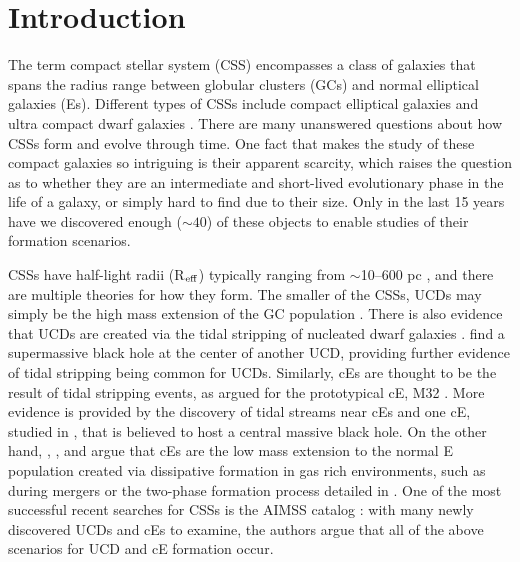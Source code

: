 \documentclass[iop,apj]{emulateapj}
\newcommand{\Reff}{R$_{\rm eff}$}
\begin{document}
\section{Introduction}
\label{intro}

  The term compact stellar system (CSS) encompasses a class of galaxies that spans the radius range between globular clusters (GCs) and normal elliptical galaxies (Es). Different types of CSSs include compact elliptical galaxies \citep[cEs;][]{Faber1973} and ultra compact dwarf galaxies \citep[UCDs;][]{Phillipps2001}. There are many unanswered questions about how CSSs form and evolve through time. One fact that makes the study of these compact galaxies so intriguing is their apparent scarcity, which raises the question as to whether they are an intermediate and short-lived evolutionary phase in the life of a galaxy, or simply hard to find due to their size. Only in the last 15 years have we discovered enough ($\sim 40$) of these objects to enable studies of their formation scenarios.

CSSs have half-light radii (\Reff) typically ranging from $\sim$10--600 pc \citep[e.g.,][]{Norris2014}, and there are multiple theories for how they form. The smaller of the CSSs, UCDs may simply be the high mass extension of the GC population \citep{Drinkwater2000, Mieske2002}. There is also evidence that UCDs are created via the tidal stripping of nucleated dwarf galaxies \citep{Bekki2001, Bekki2003, Norris2011, Jennings2015, Zhang2015}. \citet{Seth2014} find a supermassive black hole at the center of another UCD, providing further evidence of tidal stripping being common for UCDs. Similarly, cEs are thought to be the result of tidal stripping events, as argued for the prototypical cE, M32 \citep{Choi2002, Graham2002, Huxor2011}. More evidence is provided by the discovery of tidal streams near cEs \citep{SmithCastelli2008a,Chilingarian2009} and one cE, studied in \citet{Kormendy1997}, that is believed to host a central massive black hole. On the other hand, \citet{Wirth1984}, \citet{Kormendy2009}, and \citet{Kormendy2012a} argue that cEs are the low mass extension to the normal E population created via dissipative formation in gas rich environments, such as during mergers or the two-phase formation process detailed in \citet{Oser2010}. One of the most successful recent searches for CSSs is the AIMSS catalog \citep{Norris2014}: with many newly discovered UCDs and cEs to examine, the authors argue that all of the above scenarios for UCD and cE formation occur.
\end{document}
